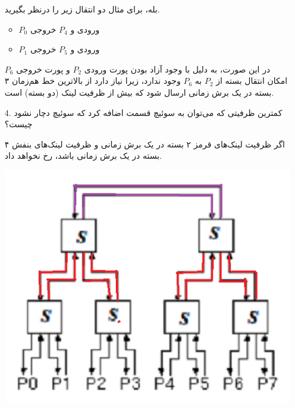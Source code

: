 \begin{enumerate}
	\item [ ]
	\begin{qsolve}
		
		بله، برای مثال دو انتقال زیر را درنظر بگیرید.
		\begin{itemize}
			\item $P_0$ ورودی و $P_4$ خروجی
			\item $P_1$ ورودی و $P_5$ خروجی
		\end{itemize}
		
		در این صورت، به دلیل  با وجود آزاد بودن پورت ورودی $P_2$ و پورت خروجی $P_6$ امکان انتقال بسته از $P_2$ به $P_6$ وجود ندارد، زیرا نیاز دارد از بالاترین خط هم‌زمان ۳ بسته در یک برش زمانی ارسال شود که بیش از ظرفیت لینک (دو بسته) است.
		
	\end{qsolve}
	
	
	\item [4.]
	کمترین ظرفیتی که می‌توان به سوئیچ قسمت  اضافه کرد که سوئیچ دچار  نشود چیست؟
	\begin{qsolve}
		اگر ظرفیت لینک‌های قرمز ۲ بسته در یک برش زمانی و ظرفیت لینک‌های بنفش ۴ بسته در یک برش زمانی باشد،  رخ نخواهد داد.
		
		\begin{center}
			\includegraphics*[width=0.5\linewidth]{pics/img5.png}
		\end{center}
	\end{qsolve}
	
	
	
\end{enumerate}